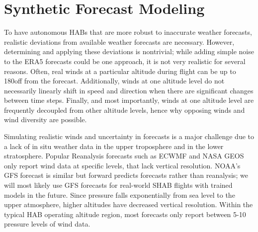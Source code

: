 \section{Synthetic Forecast Modeling}\label{section:SynthForecastModeling}

To have autonomous HABs that are more robust to inaccurate weather forecasts, realistic deviations from available weather forecasts are necessary.  However, determining and applying these deviations is nontrivial; while adding simple noise to the ERA5 forecasts could be one approach, it is not very realistic for several reasons. Often, real winds at a particular altitude during flight can be up to 180\degree off from the forecast.  Additionally, winds at one altitude level do not necessarily linearly shift in speed and direction when there are significant changes between time steps. 
Finally, and most importantly, winds at one altitude level are frequently decoupled from other altitude levels, hence why opposing winds and wind diversity are possible. %


Simulating realistic winds and uncertainty in forecasts is a major challenge due to a lack of in situ weather data in the upper troposphere and in the lower stratosphere. Popular Reanalysis forecasts such as ECWMF and NASA GEOS only report wind data at specific levels, that lack vertical resolution. NOAA's GFS forecast is similar but forward predicts forecasts rather than reanalysis;  we will most likely use GFS forecasts for real-world SHAB flights with trained models in the future. Since pressure falls exponentially from sea level to the upper atmosphere,  higher altitudes have decreased vertical resolution. Within the typical HAB operating altitude region, most forecasts only report between 5-10 pressure levels of wind data. 

